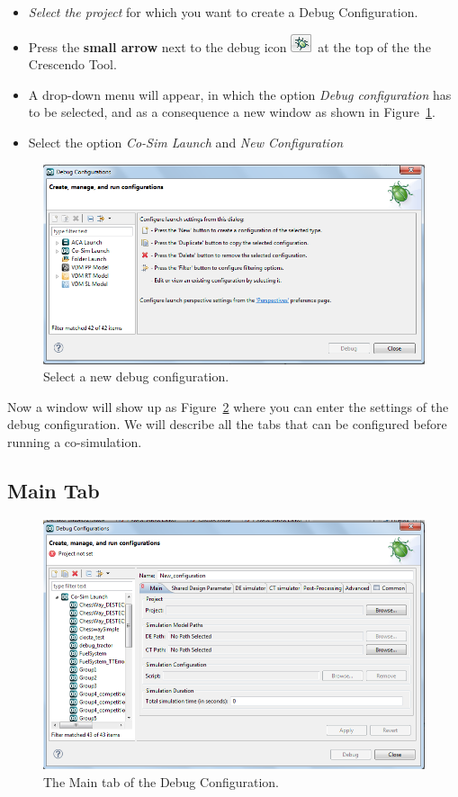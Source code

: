\documentclass{crescendorepchap}
\begin{document}
\begin{itemize}
\item
  \emph{Select the project} for which you want to create a Debug
  Configuration.
\item
  Press the \textbf{small arrow} next to the debug icon
  \includegraphics{images/DestecsDebugButton.png}~at the top of the
  the Crescendo Tool.
\item
  A drop-down menu will appear, in which the option
  \emph{Debug configuration} has to be selected, and as a consequence
a new window as shown in Figure~\ref{fig:DestecsDebugConfigurationNew}.
\item
  Select the option \emph{Co-Sim Launch} and
  \emph{New Configuration}
\end{itemize}

\begin{figure}[htbp]
\centering
\includegraphics[width=.6\textwidth]{images/DestecsDebugConfigurationNew.png}
\caption{Select a new debug configuration.\label{fig:DestecsDebugConfigurationNew}}
\end{figure}

Now a window will show up as Figure~\ref{fig:DestecsDebugConfigurationMain}
where you can enter the settings of the debug
configuration. We will describe all the tabs that can be configured before running a
co-simulation.

\subsection{Main Tab}

\begin{figure}[htbp]
\centering
\includegraphics[width=.8\textwidth]{images/DestecsDebugConfigurationMain.png}
\caption{The Main tab of the Debug Configuration.\label{fig:DestecsDebugConfigurationMain}}
\end{figure}
\end{document}
